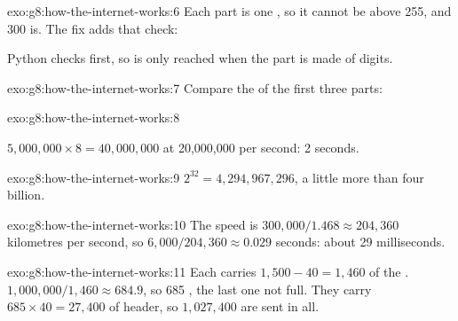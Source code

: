 \begin{solution}{exo:g8:how-the-internet-works:6}
Each part is one , so it cannot be above 255, and 300 is. The fix adds
that check:

\label{lst:g8:how-the-internet-works:sol-valid}

Python checks  first, so  is only
reached when the part is made of digits.
\end{solution}

\begin{solution}{exo:g8:how-the-internet-works:7}
Compare the  of the first three parts:

\label{lst:g8:how-the-internet-works:sol-same}
\end{solution}

\begin{solution}{exo:g8:how-the-internet-works:8}
\label{lst:g8:how-the-internet-works:sol-time}

$5{,}000{,}000 \times 8 = 40{,}000{,}000$  at 20,000,000  per second:
2 seconds.
\end{solution}

\begin{solution}{exo:g8:how-the-internet-works:9}
$2^{32} = 4{,}294{,}967{,}296$, a little more than four billion.
\end{solution}

\begin{solution}{exo:g8:how-the-internet-works:10}
The speed is $300{,}000 / 1.468 \approx 204{,}360$ kilometres per second, so
$6{,}000 / 204{,}360 \approx 0.029$ seconds: about 29 milliseconds.
\end{solution}

\begin{solution}{exo:g8:how-the-internet-works:11}
Each  carries $1{,}500 - 40 = 1{,}460$  of the .
$1{,}000{,}000 / 1{,}460 \approx 684.9$, so 685 , the last one not
full. They carry $685 \times 40 = 27{,}400$  of header, so
$1{,}027{,}400$  are sent in all.
\end{solution}


